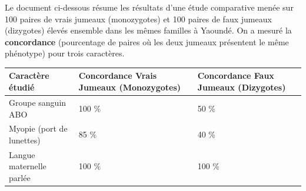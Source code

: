 \documentclass[11pt]{article}
\begin{document}
\begin{exercice}
Le document ci-dessous résume les résultats d'une étude comparative menée sur 100 paires de vrais jumeaux (monozygotes) et 100 paires de faux jumeaux (dizygotes) élevés ensemble dans les mêmes familles à Yaoundé. On a mesuré la \textbf{concordance} (pourcentage de paires où les deux jumeaux présentent le même phénotype) pour trois caractères.

\begin{center}
\begin{tabularx}{\linewidth}{|l|X|X|}\hline
\textbf{Caractère étudié} & \textbf{Concordance Vrais Jumeaux (Monozygotes)} & \textbf{Concordance Faux Jumeaux (Dizygotes)} \\ \hline
Groupe sanguin ABO & 100 \% & 50 \% \\ \hline
Myopie (port de lunettes) & 85 \% & 40 \% \\ \hline
Langue maternelle parlée & 100 \% & 100 \% \\ \hline
\end{tabularx}
\end{center}


\end{exercice}
\end{document}

